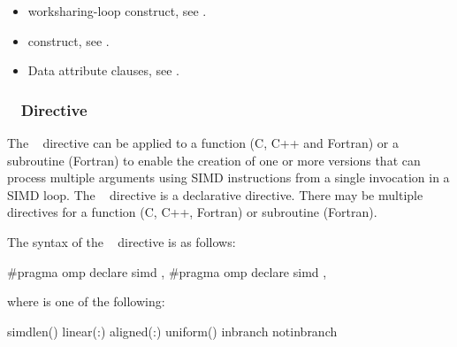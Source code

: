 \begin{samepage}
\crossreferences
\begin{itemize}
\item worksharing-loop construct, see
.

\item {} construct, see
.

\item Data attribute clauses, see
.
\end{itemize}
\end{samepage}



\subsubsection{~ Directive}
\label{subsubsec:declare simd Directive}
\summary
The ~ directive can be applied to a function 
(C, C++ and Fortran) or a subroutine (Fortran) to enable the creation 
of one or more versions that can process multiple arguments using SIMD 
instructions from a single invocation in a SIMD loop. The 
~ directive is a declarative directive. There 
may be multiple ~ directives for a function 
(C, C++, Fortran) or subroutine (Fortran).

\syntax
The syntax of the ~ directive is as follows:

\begin{ccppspecific}
\begin{ompcPragma}
#pragma omp declare simd \plc{[clause[ [},\plc{] clause] ... ] new-line}
\plc{[}#pragma omp declare simd \plc{[clause[ [},\plc{] clause] ... ] new-line]}
\plc{[ ... ]}
\end{ompcPragma}

where  is one of the following:

\begin{indentedcodelist}
simdlen()
linear(\plc{linear-list[ }:\plc{ linear-step]})
aligned(\plc{argument-list[ }:\plc{ alignment]})
uniform()
inbranch
notinbranch
\end{indentedcodelist}
\end{ccppspecific}


